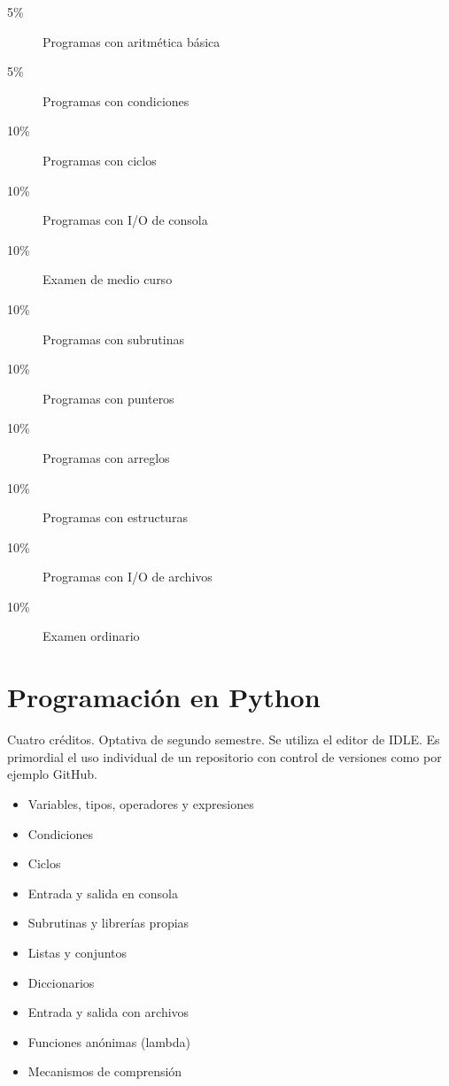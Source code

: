 \documentclass{article}
\begin{document}
\begin{multicols}{4}
\begin{description}
\item[5\%]{Programas con aritm\'{e}tica b\'{a}sica}
\item[5\%]{Programas con condiciones} 
\item[10\%]{Programas con ciclos}
\item[10\%]{Programas con I/O de consola}
\item[10\%]{Examen de medio curso}
\item[10\%]{Programas con subrutinas}
\item[10\%]{Programas con punteros}
\item[10\%]{Programas con arreglos}
\item[10\%]{Programas con estructuras}
\item[10\%]{Programas con I/O de archivos}            
\item[10\%]{Examen ordinario}
\end{description}

\vfill\null \columnbreak

\hypertarget{pep}{\section*{Programaci\'{o}n en Python}}

Cuatro cr\'{e}ditos. Optativa de segundo semestre. Se utiliza el
editor de IDLE. Es primordial el uso individual de un repositorio con
control de versiones como por ejemplo GitHub.

\begin{itemize}
\item{Variables, tipos, operadores y expresiones}
\item{Condiciones}
\item{Ciclos}
\item{Entrada y salida en consola}  
\item{Subrutinas y librer\'{i}as propias}
\item{Listas y conjuntos}
\item{Diccionarios}  
\item{Entrada y salida con archivos}    
\item{Funciones an\'{o}nimas (lambda)}
\item{Mecanismos de comprensi\'{o}n}
\end{itemize}


\end{multicols}
\end{document}
